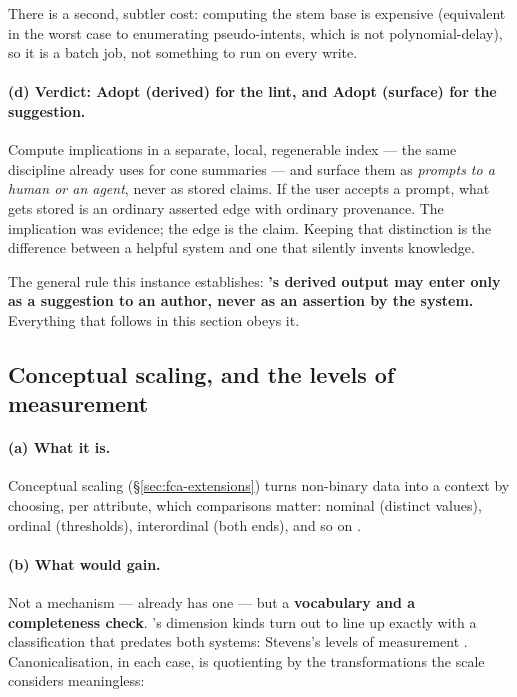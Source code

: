 There is a second, subtler cost: computing the stem base is expensive
(equivalent in the worst case to enumerating pseudo-intents, which is not
polynomial-delay), so it is a batch job, not something to run on every write.

\paragraph{(d) Verdict: \textbf{Adopt (derived)} for the lint, and
\textbf{Adopt (surface)} for the suggestion.} Compute implications in a
separate, local, regenerable index --- the same discipline \odag{} already
uses for cone summaries --- and surface them as \emph{prompts to a human or an
agent}, never as stored claims. If the user accepts a prompt, what gets stored
is an ordinary asserted edge with ordinary provenance. The implication was
evidence; the edge is the claim. Keeping that distinction is the difference
between a helpful system and one that silently invents knowledge.

\begin{keyidea}
The general rule this instance establishes: \textbf{\fca{}'s derived output
may enter \odag{} only as a suggestion to an author, never as an assertion by
the system.} Everything that follows in this section obeys it.
\end{keyidea}

\subsection{Conceptual scaling, and the levels of measurement}
\label{sec:learn-scaling}

\paragraph{(a) What it is.} Conceptual scaling (\S\ref{sec:fca-extensions})
turns non-binary data into a context by choosing, per attribute, which
comparisons matter: nominal (distinct values), ordinal (thresholds),
interordinal (both ends), and so on \citep[ch.~1]{ganter1999}.

\paragraph{(b) What \odag{} would gain.} Not a mechanism --- \odag{} already
has one --- but a \textbf{vocabulary and a completeness check}. \odag{}'s
dimension kinds turn out to line up exactly with a classification that
predates both systems: Stevens's levels of measurement \citep{stevens1946}.
Canonicalisation, in each case, is quotienting by the transformations the
scale considers meaningless:

